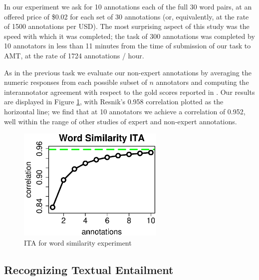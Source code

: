 \documentclass[11pt]{article}
\begin{document}
In our experiment we ask for 10 annotations each of the full 30 word pairs, at an offered price of \$0.02 for each set of 30 annotations (or, equivalently, at the rate of 1500 annotations per USD).  The most surprising aspect of this study was the speed with which it was completed; the task of 300 annotations was completed by 10 annotators in less than 11 minutes from the time of submission of our task to AMT, at the rate of 1724 annotations / hour.

As in the previous task we evaluate our non-expert annotations by averaging the numeric responses from each possible subset of $n$ annotators and computing the interannotator agreement with respect to the gold scores reported in \cite{MC}.  Our results are displayed in Figure \ref{wordsimITA}, with Resnik's 0.958 correlation plotted as the horizontal line; we find that at 10 annotators we achieve a correlation of 0.952, well within the range of other studies of expert and non-expert annotations.


\begin{figure}[ht]
\centering
\includegraphics[width=7cm]{figures/wordsim.eps}
\caption{ITA for word similarity experiment } \label{wordsimITA}
\end{figure}


\subsection{ Recognizing Textual Entailment }
\end{document}
